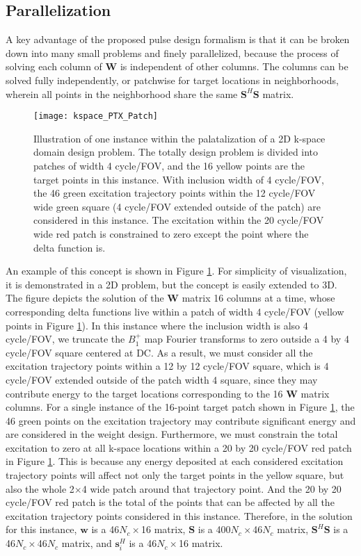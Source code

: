 \subsection*{Parallelization}
\par A key advantage of the proposed pulse design formalism is that it can be broken down into many small problems and finely parallelized, because the process of solving each column of $\mathbf{W}$ is independent of other columns. The columns can be solved fully independently, or patchwise for target locations in neighborhoods, wherein all points in the neighborhood share the same $\mathbf{S}^{H}\mathbf{S}$ matrix. 
\begin{figure}
	\centering
	\texttt{[image: kspace\_PTX\_Patch]}
	\caption{Illustration of one instance within the palatalization of a 2D k-space domain design problem. The totally design problem is divided into patches of width 4 cycle/FOV, and the 16 yellow points are the target points in this instance. With inclusion width of 4 cycle/FOV, the 46 green excitation trajectory points within the 12 cycle/FOV wide green square (4 cycle/FOV extended outside of the patch) are considered in this instance. The excitation within the 20 cycle/FOV wide red patch is constrained to zero except the point where the delta function is.}
	\label{fig:Patch}
\end{figure}
An example of this concept is shown in Figure \ref{fig:Patch}. For simplicity of visualization, it is demonstrated in a 2D problem, but the concept is easily extended to 3D. The figure depicts the solution of the $\mathbf{W}$ matrix 16 columns at a time, whose corresponding delta functions live within a patch of width 4 cycle/FOV (yellow points in Figure \ref{fig:Patch}). In this instance where the inclusion width is also 4 cycle/FOV, we truncate the $B_1^+$ map Fourier transforms to zero outside a 4 by 4 cycle/FOV square centered at DC. As a result, we must consider all the excitation trajectory points within a 12 by 12 cycle/FOV square, which is 4 cycle/FOV extended outside of the patch width 4 square, since they may contribute energy to the target locations corresponding to the 16 $\mathbf{W}$ matrix columns. For a single instance of the 16-point target patch shown in Figure \ref{fig:Patch}, the 46 green points on the excitation trajectory may contribute significant energy and are considered in the weight design. Furthermore, we must constrain the total excitation to zero at all k-space locations within a 20 by 20 cycle/FOV red patch in Figure \ref{fig:Patch}. This is because any energy deposited at each considered excitation trajectory points will affect not only the target points in the yellow square, but also the whole 2$\times$4 wide patch around that trajectory point. And the 20 by 20 cycle/FOV red patch is the total of the points that can be affected by all the excitation trajectory points considered in this instance. Therefore, in the solution for this instance, $\mathbf{w}$ is a 46$N_c\times$16 matrix, $\mathbf{S}$ is a 400$N_c\times$46$N_c$ matrix, $\mathbf{S}^{H}\mathbf{S}$ is a 46$N_c\times$46$N_c$ matrix, and $\mathbf{s}_i^{H}$ is a 46$N_c\times$16 matrix. 
